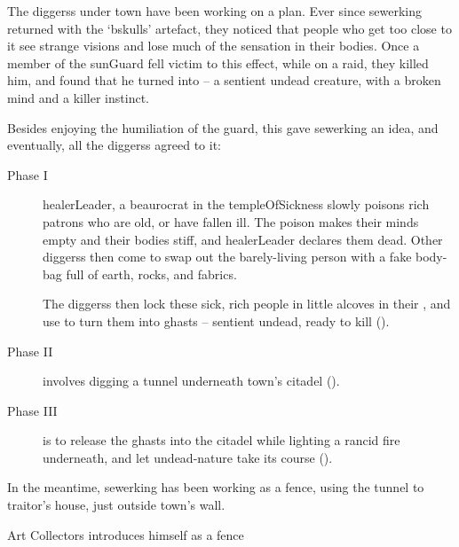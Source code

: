 \label{sewerking}

\begin{exampletext}
  \noindent
  The \glspl{diggers} under \gls{town} have been working on a plan.
  Ever since \gls{sewerking} returned with the `\gls{bskulls}' \gls{artefact}, they noticed that people who get too close to it see strange visions and lose much of the sensation in their bodies.
  Once a member of the \gls{sunGuard} fell victim to this effect, while on a raid, they killed him, and found that he turned into  -- a sentient undead creature, with a broken mind and a killer instinct.

  Besides enjoying the humiliation of the guard, this gave \gls{sewerking} an idea, and eventually, all the \glspl{diggers} agreed to it:

\end{exampletext}

\null
\label{ghastPlan}
\begin{description}
  \item[Phase I]
  \Gls{healerLeader}, a beaurocrat in the \gls{templeOfSickness} slowly poisons rich patrons who are old, or have fallen ill.
  The poison makes their minds empty and their bodies stiff, and \gls{healerLeader} declares them dead.
  Other \glspl{diggers} then come to swap out the barely-living person with a fake body-bag full of earth, rocks, and fabrics.

  The \glspl{diggers} then lock these sick, rich people in little alcoves in their , and use  to turn them into \glspl{ghast} -- sentient undead, ready to kill ().
  \item[Phase II]
  involves digging a tunnel underneath \gls{town}'s citadel ().
  \item[Phase III]
  is to release the \glspl{ghast} into the citadel while lighting a rancid fire underneath, and let undead-nature take its course ().
\end{description}
\null

In the meantime, \gls{sewerking} has been working as a fence, using the tunnel to \gls{traitor}'s house, just outside \gls{town}'s wall.

{Art Collectors}%
{ introduces himself as a fence}%
\label{sewerPt1}

